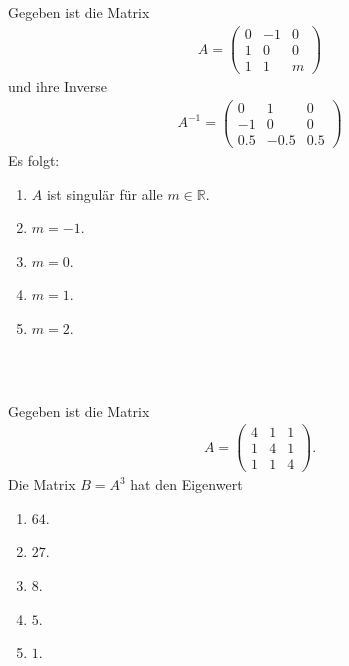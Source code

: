 \subsection*{}
Gegeben ist die Matrix
\begin{align*}
	A =
	\begin{pmatrix}
		0 & -1 & 0 \\
		1 & 0 & 0 \\
		1 & 1 & m
	\end{pmatrix}
\end{align*}
und ihre Inverse
\begin{align*}
		A^{-1} =
	\begin{pmatrix}
		0 & 1 & 0 \\
		-1 & 0 & 0 \\
		0.5 & -0.5 &0.5
	\end{pmatrix}
\end{align*}
Es folgt:
\renewcommand{\labelenumi}{(\alph{enumi})}
\begin{enumerate}
	\item 
	$ A $ ist singulär für alle $ m \in \mathbb{R} $.
	\item 
	$ m = -1 $.
	\item
	$ m = 0 $.
	\item
	$ m = 1 $.
	\item
	$ m = 2 $.
\end{enumerate}
\ \\
\subsection*{}
Gegeben ist die Matrix
\begin{align*}
	A =
	\begin{pmatrix}
		4 & 1 & 1 \\
		1 & 4 & 1 \\
		1 & 1 & 4
	\end{pmatrix}.
\end{align*}
Die Matrix $ B = A^3 $ hat den Eigenwert
\renewcommand{\labelenumi}{(\alph{enumi})}
\begin{enumerate}
\item
$ 64 $.
\item
$ 27 $.	
\item 
$ 8 $.
\item
$ 5 $.
\item
$ 1 $.
\end{enumerate}
\ \\
